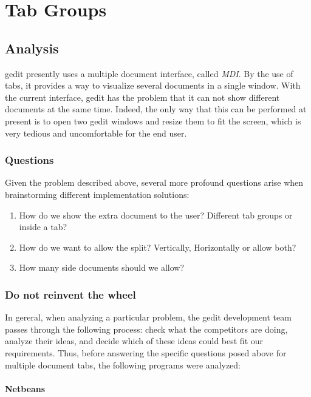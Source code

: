 \chapter{Tab Groups}\label{chap:TabGroups}

\section{Analysis}

gedit presently uses a multiple document interface, called \emph{MDI}. By the use of tabs, it provides a way to visualize several documents in a single window. With the current interface,  gedit has the problem that it can not show different documents at the same time.  Indeed,  the only way that this can be performed at present is to open two gedit windows and resize them to fit the screen, which is very tedious and uncomfortable for the end user.

\subsection{Questions}


Given the problem described above, several more profound questions arise when brainstorming different implementation solutions: 
\begin{enumerate}
  \item How do we show the extra document to the user? Different tab groups or inside a tab?
  \item How do we want to allow the split? Vertically, Horizontally or allow both?
  \item How many side documents should we allow?
\end{enumerate}

\subsection{Do not reinvent the wheel}

In gereral, when analyzing a particular problem, the gedit development team passes through the following process: 
check what the competitors are doing, analyze their ideas,  and decide which of these ideas could best fit our requirements. 
Thus, before answering the specific questions posed above for multiple document tabs, the following programs were analyzed:



\subsubsection{Netbeans}

